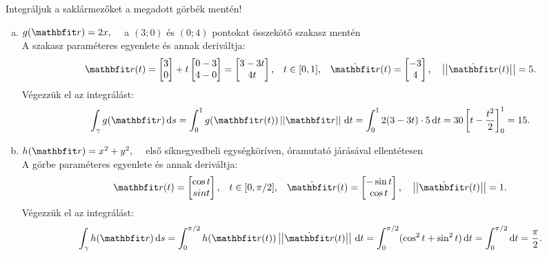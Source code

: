 \documentclass[exercise]{math-standalone}
\begin{document}
\begin{exercise}{Integráljuk a saklármezőket a megadott görbék mentén!}
{\begin{enumerate}[a)]
      \item $g(\rvec r) = 2x, \quad$ a $(3;0)$ és $(0;4)$ pontokat összekötő szakasz mentén\\[3mm]
            A szakasz paraméteres egyenlete és annak deriváltja:
            \[
              \rvec r(t) = \begin{bmatrix}
                3 \\ 0
              \end{bmatrix} + t \begin{bmatrix}
                0 - 3 \\ 4 - 0
              \end{bmatrix} = \begin{bmatrix}
                3 - 3t \\ 4t
              \end{bmatrix}
              \text, \quad
              t \in [0,1]
              \text, \quad
              \dot{\rvec r} (t) = \begin{bmatrix}
                -3 \\ 4
              \end{bmatrix}
              \text, \quad
              \norma{\dot{\rvec r}(t)}
              = 5
              \text.
            \]
            Végezzük el az integrálást:
            \[
              \int_\gamma g(\rvec r) \, \diff s
              = \int_0^1 g(\rvec r(t)) \norma{\rvec r} \, \diff t
              = \int_0^1 2 (3 - 3t) \cdot 5 \, \diff t
              = 30 \left[ t - \frac{t^2}{2} \right]_0^1
              = 15
              \text.
            \]

      \item $h(\rvec r) = x^2 + y^2, \quad$ első síknegyedbeli egységköríven, óramutató járásával ellentétesen\\[3mm]
            A görbe paraméteres egyenlete és annak deriváltja:
            \[
              \rvec r(t) = \begin{bmatrix}
                \cos t \\ sin t
              \end{bmatrix}
              \text, \quad
              t \in [0, \pi/2]
              \text, \quad
              \dot{\rvec r}(t) = \begin{bmatrix}
                -\sin t \\ \cos t
              \end{bmatrix}
              \text, \quad
              \norma{\dot{\rvec r}(t)}
              = 1
              \text.
            \]
            Végezzük el az integrálást:
            \[
              \int_\gamma h(\rvec r) \, \diff s
              = \int_0^{\pi/2} h(\rvec r(t)) \norma{\dot{\rvec r}(t)} \, \diff t
              = \int_0^{\pi/2} (\cos^2 t + \sin^2 t) \, \diff t
              = \int_0^{\pi/2} \diff t
              = \frac{\pi}{2}
              \text.
            \]


\end{enumerate}}
\end{exercise}
\end{document}
